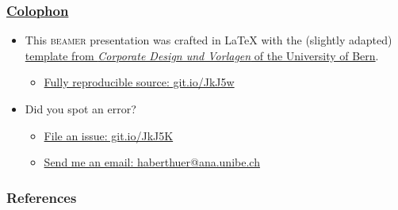\documentclass[aspectratio=169]{beamer}
\begin{document}
\begin{frame}
	\frametitle{\href{https://en.wikipedia.org/wiki/Colophon_(publishing)}{Colophon}}
	\begin{itemize}
		\item This \textsc{beamer} presentation was crafted in \LaTeX\xspace with the (slightly adapted) \href{http://intern.unibe.ch/dienstleistungen/corporate_design_und_vorlagen/praesentationen/index_ger.html}{template from \emph{Corporate Design und Vorlagen} of the University of Bern}.
		\begin{itemize}
			\item \href{https://github.com/habi/20201112_Anatomie_Seminar}{Fully reproducible source: git.io/JkJ5w}
		\end{itemize}
		\item Did you spot an error?
		\begin{itemize}
			\item \href{https://github.com/habi/20201112_Anatomie_Seminar/issues}{File an issue: git.io/JkJ5K}
			\item \href{mailto:haberthuer@ana.unibe.ch?subject=Error\%20in\%20the\%20seminar\%20presentation\&body=https://xkcd.com/386/}{Send me an email: haberthuer@ana.unibe.ch}
		\end{itemize}
	\end{itemize}
\end{frame}

\begin{frame}[label=current]
	\frametitle{References}
	\renewcommand*{\bibfont}{\footnotesize}
	\printbibliography
\end{frame}
\end{document}
